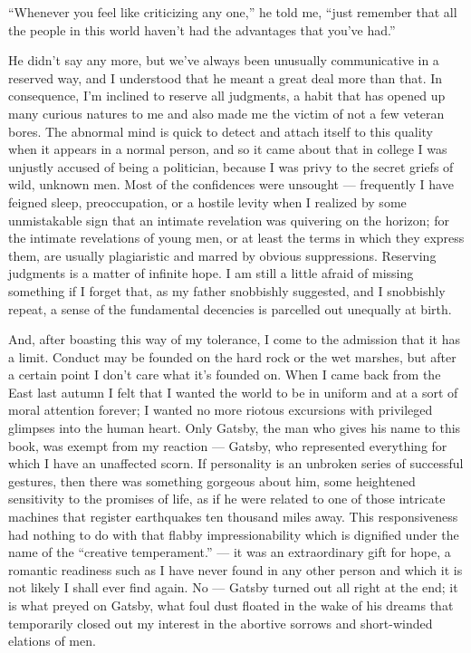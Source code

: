 \documentclass{znotebook}
\begin{document}
``Whenever you feel like criticizing any one,'' he told me, ``just remember that all the people in this world haven't had the advantages that you've had.''

He didn't say any more, but we've always been unusually communicative in a reserved way, and I understood that he meant a great deal more than that. In consequence, I'm inclined to reserve all judgments, a habit that has opened up many curious natures to me and also made me the victim of not a few veteran bores. The abnormal mind is quick to detect and attach itself to this quality when it appears in a normal person, and so it came about that in college I was unjustly accused of being a politician, because I was privy to the secret griefs of wild, unknown men. Most of the confidences were unsought ---{} frequently I have feigned sleep, preoccupation, or a hostile levity when I realized by some unmistakable sign that an intimate revelation was quivering on the horizon; for the intimate revelations of young men, or at least the terms in which they express them, are usually plagiaristic and marred by obvious suppressions. Reserving judgments is a matter of infinite hope. I am still a little afraid of missing something if I forget that, as my father snobbishly suggested, and I snobbishly repeat, a sense of the fundamental decencies is parcelled out unequally at birth.

And, after boasting this way of my tolerance, I come to the admission that it has a limit. Conduct may be founded on the hard rock or the wet marshes, but after a certain point I don't care what it's founded on. When I came back from the East last autumn I felt that I wanted the world to be in uniform and at a sort of moral attention forever; I wanted no more riotous excursions with privileged glimpses into the human heart. Only Gatsby, the man who gives his name to this book, was exempt from my reaction ---{} Gatsby, who represented everything for which I have an unaffected scorn. If personality is an unbroken series of successful gestures, then there was something gorgeous about him, some heightened sensitivity to the promises of life, as if he were related to one of those intricate machines that register earthquakes ten thousand miles away. This responsiveness had nothing to do with that flabby impressionability which is dignified under the name of the ``creative temperament.'' ---{} it was an extraordinary gift for hope, a romantic readiness such as I have never found in any other person and which it is not likely I shall ever find again. No ---{} Gatsby turned out all right at the end; it is what preyed on Gatsby, what foul dust floated in the wake of his dreams that temporarily closed out my interest in the abortive sorrows and short-winded elations of men.
\end{document}
